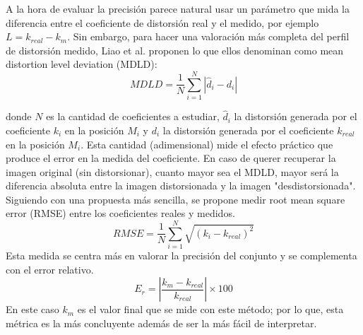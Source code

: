 \documentclass[12pt]{article}
\numberwithin{equation}{section}%
\newcommand{\lightit}[1]{{\lightitfont #1}}
\begin{document}
A la hora de evaluar la precisión parece natural usar un parámetro que mida la diferencia entre el coeficiente de distorsión real y el medido, por ejemplo \(L=k_{real}-k_{m}\). Sin embargo, para hacer una valoración más completa del perfil de distorsión medido, Liao et al. \cite{liao2021deep} proponen lo que ellos denominan como \lightit{mean distortion level deviation} (MDLD):
\begin{equation}
    MDLD=\frac{1}{N}\sum_{i=1}^N|\hat{d}_i-d_i|
    \label{eq:MDLD}
\end{equation}

donde \(N\) es la cantidad de coeficientes a estudiar, \(\hat{d}_i\) la distorsión generada por el coeficiente \(k_{i}\) en la posición \(M_i\) y \(d_i\) la distorsión generada por el coeficiente \(k_{real}\) en la posición \(M_i\). Esta cantidad (adimensional) mide el efecto práctico que produce el error en la medida del coeficiente. En caso de querer recuperar la imagen original (sin distorsionar), cuanto mayor sea el MDLD, mayor será la diferencia absoluta entre la imagen distorsionada y la imagen "desdistorsionada".\\

Siguiendo con una propuesta más sencilla, se propone medir \lightit{root mean square error} (RMSE) entre los coeficientes reales y medidos\cite{liao2021deep}.
\begin{equation}
    RMSE=\frac{1}{N}\sum_{i=1}^N\sqrt{(k_i-k_{real})^2}
\end{equation}
Esta medida se centra más en valorar la precisión del conjunto y se complementa con el error relativo.
\begin{equation}
    E_r=|\frac{k_m-k_{real}}{k_{real}}|\times100
\end{equation}
En este caso \(k_m\) es el valor final que se mide con este método; por lo que, esta métrica es la más concluyente además de ser la más fácil de interpretar. 
\end{document}
